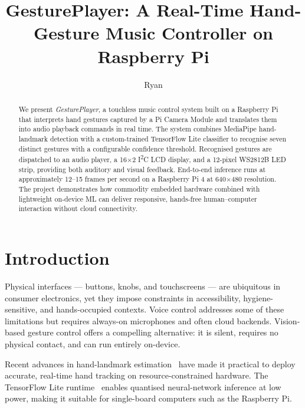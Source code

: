 \documentclass[sigconf, nonacm]{acmart}
\begin{document}
\title{GesturePlayer: A Real-Time Hand-Gesture Music Controller on Raspberry Pi}

\author{Ryan}
\email{}

\begin{abstract}
We present \textit{GesturePlayer}, a touchless music control system built on a Raspberry Pi that interprets hand gestures captured by a Pi Camera Module and translates them into audio playback commands in real time. The system combines MediaPipe hand-landmark detection with a custom-trained TensorFlow Lite classifier to recognise seven distinct gestures with a configurable confidence threshold. Recognised gestures are dispatched to an audio player, a 16$\times$2 I\textsuperscript{2}C LCD display, and a 12-pixel WS2812B LED strip, providing both auditory and visual feedback. End-to-end inference runs at approximately 12--15 frames per second on a Raspberry Pi 4 at 640$\times$480 resolution. The project demonstrates how commodity embedded hardware combined with lightweight on-device ML can deliver responsive, hands-free human--computer interaction without cloud connectivity.
\end{abstract}


\maketitle

\section{Introduction}

Physical interfaces — buttons, knobs, and touchscreens — are ubiquitous in consumer electronics, yet they impose constraints in accessibility, hygiene-sensitive, and hands-occupied contexts. Voice control addresses some of these limitations but requires always-on microphones and often cloud backends. Vision-based gesture control offers a compelling alternative: it is silent, requires no physical contact, and can run entirely on-device.

Recent advances in hand-landmark estimation~\cite{mediapipe2020} have made it practical to deploy accurate, real-time hand tracking on resource-constrained hardware. The TensorFlow Lite runtime~\cite{tflite2021} enables quantised neural-network inference at low power, making it suitable for single-board computers such as the Raspberry Pi.
\end{document}
